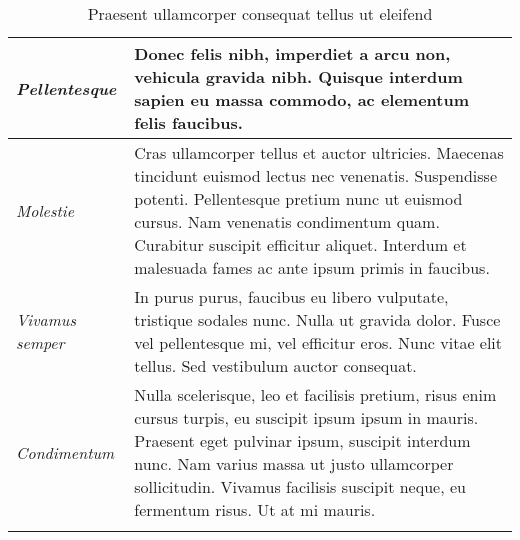 \begin{center}
\begin{longtable}{ | p{} | p{} | }
		\emph{Pellentesque}
		& Donec felis nibh, imperdiet a arcu non, vehicula gravida nibh. Quisque interdum sapien eu massa commodo, ac elementum felis faucibus.
		\\ \hline
		
		\emph{Molestie}
		& Cras ullamcorper tellus et auctor ultricies. Maecenas tincidunt euismod lectus nec venenatis. Suspendisse potenti. Pellentesque pretium nunc ut euismod cursus. Nam venenatis condimentum quam. Curabitur suscipit efficitur aliquet. Interdum et malesuada fames ac ante ipsum primis in faucibus.
		\\ \hline
		
		\emph{Vivamus semper}
		& In purus purus, faucibus eu libero vulputate, tristique sodales nunc. Nulla ut gravida dolor. Fusce vel pellentesque mi, vel efficitur eros. Nunc vitae elit tellus. Sed vestibulum auctor consequat. 
		\\ \hline
		
		\emph{Condimentum}
		& Nulla scelerisque, leo et facilisis pretium, risus enim cursus turpis, eu suscipit ipsum ipsum in mauris. Praesent eget pulvinar ipsum, suscipit interdum nunc. Nam varius massa ut justo ullamcorper sollicitudin. Vivamus facilisis suscipit neque, eu fermentum risus. Ut at mi mauris.
		\\ \hline
		
		\caption{Praesent ullamcorper consequat tellus ut eleifend}
		\label{tab:example-3}		
	\end{longtable}
\end{center}